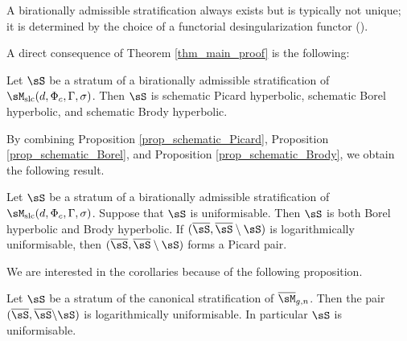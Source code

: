 \documentclass[11pt,letterpaper]{amsart}
\numberwithin{equation}{section}
\begin{document}
    A birationally admissible stratification always exists but is typically not unique; it is determined by the choice of a functorial desingularization functor (\cite[\S 6]{stjc2025}).
    
    A direct consequence of Theorem \ref{thm_main_proof} is the following:    
    \begin{cor}
    	Let $\sS$ be a stratum of a birationally admissible stratification of $\sM_{\rm slc}(d, \Phi_c, \Gamma, \sigma)$. Then $\sS$ is schematic Picard hyperbolic, schematic Borel hyperbolic, and schematic Brody hyperbolic.
    \end{cor}
    By combining Proposition \ref{prop_schematic_Picard}, Proposition \ref{prop_schematic_Borel}, and Proposition \ref{prop_schematic_Brody}, we obtain the following result.
    \begin{cor}\label{cor_log_uniform_hyperbolic}
    	Let $\sS$ be a stratum of a birationally admissible stratification of $\sM_{\rm slc}(d, \Phi_c, \Gamma, \sigma)$. Suppose that $\sS$ is uniformisable. Then $\sS$ is both Borel hyperbolic and Brody hyperbolic. If $(\overline{\sS}, \overline{\sS} \setminus \sS)$ is logarithmically uniformisable, then $(\overline{\sS}, \overline{\sS} \setminus \sS)$ forms a Picard pair.
    \end{cor}    
    We are interested in the corollaries because of the following proposition.
    \begin{prop}\label{prop_moduli_curve_uniformisable}
    	Let $\sS$ be a stratum of the canonical stratification of $\overline{\sM}_{g,n}$. Then the pair $(\overline{\sS},\overline{\sS}\backslash \sS)$ is logarithmically uniformisable. In particular $\sS$ is uniformisable.
    \end{prop}
\end{document}
